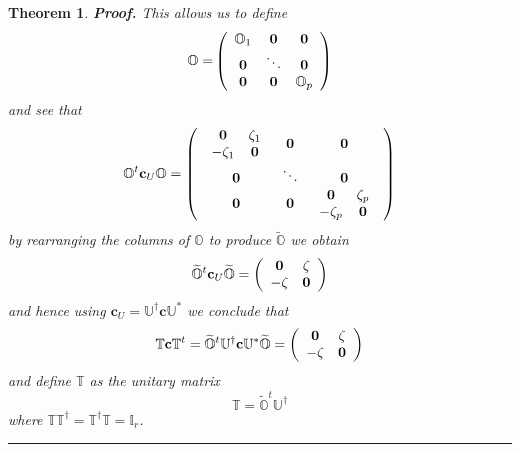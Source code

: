 \documentclass[aps,preprint]{revtex4}%
\newtheorem{theorem}{Theorem}
\newenvironment{proof}[1][Proof]{\noindent\textbf{#1.} }{\ \rule{0.5em}{0.5em}}
\begin{document}
\begin{theorem}
\begin{proof}
This allows us to define
\begin{equation}
\mathbb{O=}\left(
\begin{array}
[c]{ccc}%
\mathbb{O}_{1} & \mathbf{0} & \mathbf{0}\\
\mathbf{0} & \ddots & \mathbf{0}\\
\mathbf{0} & \mathbf{0} & \mathbb{O}_{p}%
\end{array}
\right)
\end{equation}
and see that
\begin{equation}
\mathbb{O}^{t}\mathbf{c}_{U}\mathbb{O}=\left(
\begin{array}
[c]{ccc}%
\begin{array}
[c]{cc}%
\mathbf{0} & \mathbf{\zeta}_{1}\\
-\mathbf{\zeta}_{1} & \mathbf{0}%
\end{array}
& \mathbf{0} & \mathbf{0}\\
\mathbf{0} & \ddots & \mathbf{0}\\
\mathbf{0} & \mathbf{0} &
\begin{array}
[c]{cc}%
\mathbf{0} & \mathbf{\zeta}_{p}\\
-\mathbf{\zeta}_{p} & \mathbf{0}%
\end{array}
\end{array}
\right)  \label{cor1}%
\end{equation}
by rearranging the columns of $\mathbb{O}$ to produce $\widetilde{\mathbb{O}}$
we obtain
\begin{equation}
\widetilde{\mathbb{O}}^{t}\mathbf{c}_{U}\widetilde{\mathbb{O}}=\left(
\begin{array}
[c]{cc}%
\mathbf{0} & \mathbf{\zeta}\\
-\mathbf{\zeta} & \mathbf{0}%
\end{array}
\right)
\end{equation}
and hence using $\mathbf{c}_{U}=\mathbb{U}^{\dagger}\mathbf{c}\mathbb{U}%
^{\ast}$ we conclude that
\begin{equation}
\mathbb{T}\mathbf{c}\mathbb{T}^{t}=\widetilde{\mathbb{O}}^{t}\mathbb{U}%
^{\dagger}\mathbf{c}\mathbb{U}^{\ast}\widetilde{\mathbb{O}}=\left(
\begin{array}
[c]{cc}%
\mathbf{0} & \mathbf{\zeta}\\
-\mathbf{\zeta} & \mathbf{0}%
\end{array}
\right)
\end{equation}
and define $\mathbb{T}$ as the unitary matrix
\begin{equation}
\mathbb{T}=\widetilde{\mathbb{O}}^{t}\mathbb{U}^{\dagger}%
\end{equation}
where $\mathbb{TT}^{\dagger}=\mathbb{T^{\dagger}T=I}_{r}$.
\end{proof}
\end{theorem}
\end{document}
